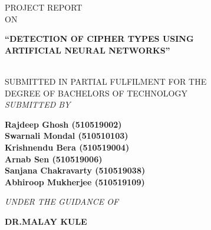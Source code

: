 \documentclass[a4paper]{article}
\begin{document}
\begin{titlepage}

    \begin{center}

        
        \textup{\large PROJECT REPORT\\[0.1cm]ON}\\[0.4cm]

        \begin{LARGE}
            \textbf {“DETECTION OF CIPHER TYPES USING}\\
            [0.2cm]
            \textbf {ARTIFICIAL NEURAL NETWORKS”}
        \end{LARGE}\\[0.4cm]

        \textup{\large SUBMITTED IN PARTIAL FULFILMENT FOR THE \\[0.1cm]DEGREE OF BACHELORS OF TECHNOLOGY}\\[0.5cm]

        \textit{SUBMITTED BY}\\[0.3cm]
        \begin{large}
            \textbf{Rajdeep Ghosh (510519002)}\\[0.1cm]
            \textbf{Swarnali Mondal (510510103)}\\[0.1cm]
            \textbf{Krishnendu Bera (510519004)}\\[0.1cm]
            \textbf{Arnab Sen (510519006)}\\[0.1cm]
            \textbf{Sanjana Chakravarty (510519038)}\\[0.1cm]
            \textbf{Abhiroop Mukherjee (510519109)}\\[0.5cm]
        \end{large}

        \textit{UNDER THE GUIDANCE OF}\\[0.3cm]
        \begin{large}
            \textbf{DR.\@ MALAY KULE}\\[0.3cm]
        \end{large}


\end{center}
\end{titlepage}
\end{document}
